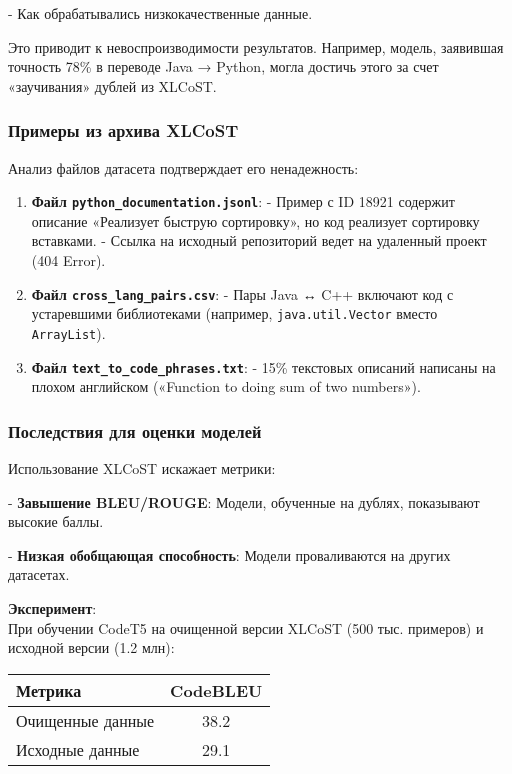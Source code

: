 \documentclass[14pt]{article}
\theoremstyle{definition}
\begin{document}
- Как обрабатывались низкокачественные данные.


Это приводит к невоспроизводимости результатов. Например, модель, заявившая точность 78\% в переводе Java → Python, могла достичь этого за счет «заучивания» дублей из XLCoST.

\subsubsection{Примеры из архива XLCoST}

Анализ файлов датасета подтверждает его ненадежность:
\begin{enumerate}
    \item \textbf{Файл \texttt{python\_documentation.jsonl}}:  
      - Пример с ID 18921 содержит описание «Реализует быструю сортировку», но код реализует сортировку вставками.  
      - Ссылка на исходный репозиторий ведет на удаленный проект (404 Error).
    \item \textbf{Файл \texttt{cross\_lang\_pairs.csv}}:  
      - Пары Java ↔ C++ включают код с устаревшими библиотеками (например, \texttt{java.util.Vector} вместо \texttt{ArrayList}).
    \item \textbf{Файл \texttt{text\_to\_code\_phrases.txt}}:  
      - 15\% текстовых описаний написаны на плохом английском («Function to doing sum of two numbers»).
\end{enumerate}

\subsubsection{Последствия для оценки моделей}

Использование XLCoST искажает метрики:

    
- \textbf{Завышение BLEU/ROUGE}: Модели, обученные на дублях, показывают высокие баллы.
    
- \textbf{Низкая обобщающая способность}: Модели проваливаются на других датасетах.


\textbf{Эксперимент}: \\
При обучении CodeT5 на очищенной версии XLCoST (500 тыс. примеров) и исходной версии (1.2 млн):
\begin{center}
\begin{tabular}{|l|c|}
\hline
\textbf{Метрика} & \textbf{CodeBLEU} \\ \hline
Очищенные данные & 38.2 \\ \hline
Исходные данные & 29.1 \\ \hline
\end{tabular}
\end{center}
\end{document}
